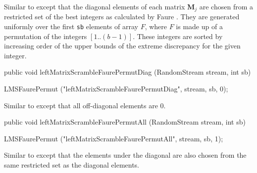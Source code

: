  \begin{tabb}
   Similar to  except that the diagonal elements
   of each matrix $\mathbf{M}_j$ are chosen from a restricted set of the best
   integers as calculated by Faure \cite{rFAU02a}. They are generated
   uniformly over the first \texttt{sb} elements of array $F$, where $F$ is
   made up of a permutation of the integers $[1..(b-1)]$. These integers are
   sorted by increasing  order of the upper bounds of the extreme discrepancy
   for the given integer.
\end{tabb}
\begin{htmlonly}
\end{htmlonly}
\begin{code}

   public void leftMatrixScrambleFaurePermutDiag (RandomStream stream,
                                                  int sb)\begin{hide} {
       LMSFaurePermut ("leftMatrixScrambleFaurePermutDiag",
                              stream, sb, 0);
   }\end{hide}
\end{code}
 \begin{tabb}
   Similar to  except that all
   off-diagonal elements are 0.
\end{tabb}
\begin{htmlonly}
\end{htmlonly}
\begin{code}

   public void leftMatrixScrambleFaurePermutAll (RandomStream stream,
                                                 int sb)\begin{hide} {
       LMSFaurePermut ("leftMatrixScrambleFaurePermutAll",
                              stream, sb, 1);
   }\end{hide}
\end{code}
 \begin{tabb}
   Similar to  except that the
   elements under the diagonal are also
   chosen from the same restricted set as the diagonal elements.
\end{tabb}
\begin{htmlonly}
\end{htmlonly}
